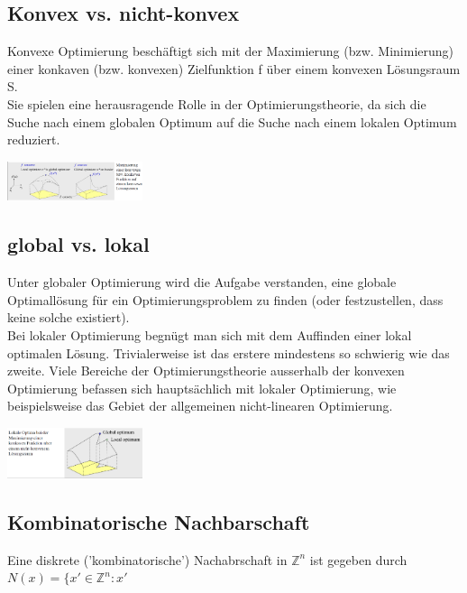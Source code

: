\documentclass{report}
\newenvironment{Figure}
	{\par\medskip\noindent\minipage{\linewidth}}
	{\endminipage\par\medskip}
\theoremstyle{definition}
\theoremstyle{example}
\begin{document}
   \subsection{Konvex vs. nicht-konvex}
Konvexe Optimierung beschäftigt sich mit der Maximierung (bzw. Minimierung) einer konkaven (bzw. konvexen) Zielfunktion f über einem konvexen Lösungsraum S.\\
Sie spielen eine herausragende Rolle in der Optimierungstheorie, da sich die Suche nach einem globalen Optimum auf die Suche nach einem lokalen Optimum reduziert.

\begin{Figure}
\centering
\includegraphics[width=150px]{img/NichtKonvex.png}
	\label{fig:Nicht konvex}
\end{Figure}

   \subsection{global vs. lokal}
Unter globaler Optimierung wird die Aufgabe verstanden, eine globale Optimallösung für ein Optimierungsproblem zu finden (oder festzustellen, dass keine solche existiert).\\
Bei lokaler Optimierung begnügt man sich mit dem Auffinden einer lokal optimalen Lösung. Trivialerweise ist das erstere mindestens so schwierig wie das zweite.
Viele Bereiche der Optimierungstheorie ausserhalb der konvexen Optimierung befassen sich hauptsächlich mit lokaler Optimierung, wie beispielsweise das Gebiet der allgemeinen nicht-linearen Optimierung.
\begin{Figure}
\centering
\includegraphics[width=150px]{img/globLoc.png}
	\label{fig:global vs local}
\end{Figure}

   \subsection{Kombinatorische Nachbarschaft}
Eine diskrete ('kombinatorische') Nachabrschaft in $\mathbb{Z}^n$ ist gegeben durch $N(x) = \{x' \in \mathbb{Z}^n: x'$
\end{document}
